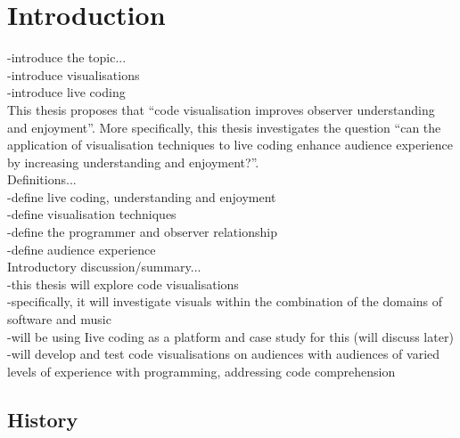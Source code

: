 
\chapter{Introduction}

-introduce the topic...\\
-introduce visualisations\\
-introduce live coding\\

This thesis proposes that ``code visualisation improves observer understanding and enjoyment''. More specifically, this thesis investigates the question ``can the application of visualisation techniques to live coding enhance audience experience by increasing understanding and enjoyment?''.\\

Definitions...\\
-define live coding, understanding and enjoyment\\
-define visualisation techniques\\
-define the programmer and observer relationship\\
-define audience experience\\

Introductory discussion/summary...\\
-this thesis will explore code visualisations\\
-specifically, it will investigate visuals within the combination of the domains of software and music\\
-will be using Iive coding as a platform and case study for this (will discuss later)\\
-will develop and test code visualisations on audiences with audiences of varied levels of experience with programming, addressing code comprehension\\

\section{History}


